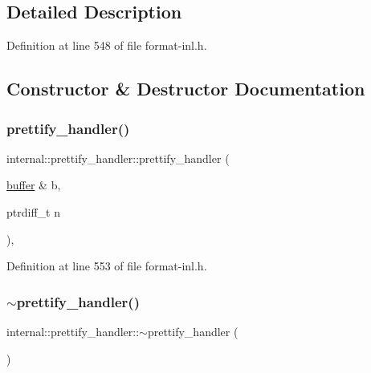 \subsection{Detailed Description}


Definition at line 548 of file format-\/inl.\+h.



\subsection{Constructor \& Destructor Documentation}
\mbox{\label{structinternal_1_1prettify__handler_a695b06224b93c0a629c17114f861bdc0}} 
\subsubsection{\texorpdfstring{prettify\+\_\+handler()}{prettify\_handler()}}
{\footnotesize\ttfamily internal\+::prettify\+\_\+handler\+::prettify\+\_\+handler (\begin{DoxyParamCaption}\item[{\hyperlink{namespaceinternal_a5fcdbc3efad1f390e6c3f0fdafa56122}{buffer} \&}]{b,  }\item[{ptrdiff\+\_\+t}]{n }\end{DoxyParamCaption})\hspace{0.3cm}{\ttfamily [inline]}, {\ttfamily [explicit]}}



Definition at line 553 of file format-\/inl.\+h.

\mbox{\label{structinternal_1_1prettify__handler_a96f87d5af83e2986ccff6090aba6e228}} 
\subsubsection{\texorpdfstring{$\sim$prettify\+\_\+handler()}{~prettify\_handler()}}
{\footnotesize\ttfamily internal\+::prettify\+\_\+handler\+::$\sim$prettify\+\_\+handler (\begin{DoxyParamCaption}{ }\end{DoxyParamCaption})\hspace{0.3cm}{\ttfamily [inline]}}



